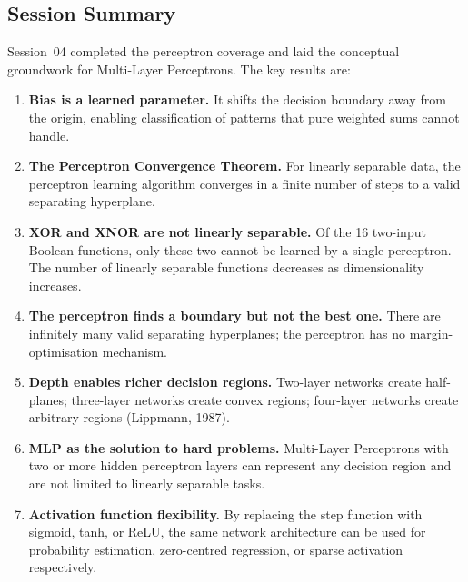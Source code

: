 \documentclass[12pt,a4paper]{article}
\begin{document}
\subsection{Session Summary}
\label{subsec:summary}

Session~04 completed the perceptron coverage and laid the conceptual
groundwork for Multi-Layer Perceptrons.  The key results are:

\begin{enumerate}[label=\textbf{\arabic*.}, noitemsep]
  \item \textbf{Bias is a learned parameter.}  It shifts the decision
        boundary away from the origin, enabling classification of patterns
        that pure weighted sums cannot handle.

  \item \textbf{The Perceptron Convergence Theorem.}  For linearly
        separable data, the perceptron learning algorithm converges in a
        finite number of steps to a valid separating hyperplane.

  \item \textbf{XOR and XNOR are not linearly separable.}  Of the 16
        two-input Boolean functions, only these two cannot be learned by a
        single perceptron.  The number of linearly separable functions
        decreases as dimensionality increases.

  \item \textbf{The perceptron finds a boundary but not the best one.}
        There are infinitely many valid separating hyperplanes; the
        perceptron has no margin-optimisation mechanism.

  \item \textbf{Depth enables richer decision regions.}  Two-layer
        networks create half-planes; three-layer networks create convex
        regions; four-layer networks create arbitrary regions
        (Lippmann, 1987).

  \item \textbf{MLP as the solution to hard problems.}  Multi-Layer
        Perceptrons with two or more hidden perceptron layers can
        represent any decision region and are not limited to linearly
        separable tasks.

  \item \textbf{Activation function flexibility.}  By replacing the step
        function with sigmoid, tanh, or ReLU, the same network
        architecture can be used for probability estimation, zero-centred
        regression, or sparse activation respectively.
\end{enumerate}
\end{document}
